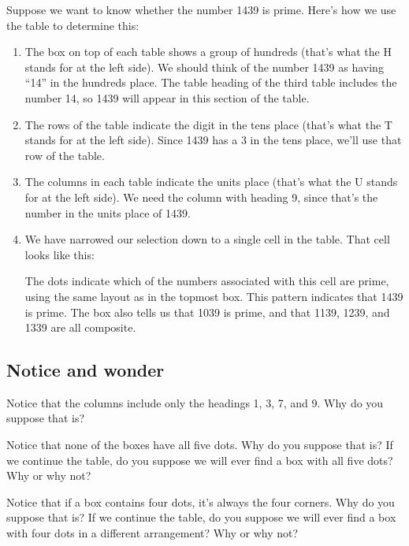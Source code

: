 Suppose we want to know whether the number 1439 is prime. Here's how we use the table to determine this:
\begin{enumerate}
\item The box on top of each table shows a group of hundreds (that's what the H stands for at the left side). We should think of the number 1439 as having ``14'' in the hundreds place. The table heading of the third table includes the number 14, so 1439 will appear in this section of the table.

\item The rows of the table indicate the digit in the tens place (that's what the T stands for at the left side). Since 1439 has a 3 in the tens place, we'll use that row of the table.

\item The columns in each table indicate the units place (that's what the U stands for at the left side). We need the column with heading 9, since that's the number in the units place of 1439.

\item We have narrowed our selection down to a single cell in the table. That cell looks like this:
\begin{center}\end{center}
The dots indicate which of the numbers associated with this cell are prime, using the same layout as in the topmost box. This pattern indicates that 1439 is prime. The box also tells us that 1039 is prime, and that 1139, 1239, and 1339 are all composite.
\end{enumerate}

\subsection*{Notice and wonder}

Notice that the columns include only the headings 1, 3, 7, and 9. Why do you suppose that is?

Notice that none of the boxes have all five dots. Why do you suppose that is? If we continue the table, do you suppose we will ever find a box with all five dots? Why or why not?

Notice that if a box contains four dots, it's always the four corners. Why do you suppose that is? If we continue the table, do you suppose we will ever find a box with four dots in a different arrangement? Why or why not?

